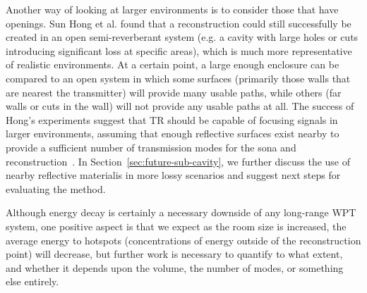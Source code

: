 Another way of looking at larger environments is to consider those that have openings. Sun Hong et al. found that a reconstruction could still successfully be created in an open semi-reverberant system (e.g. a cavity with large holes or cuts introducing significant loss at specific areas), which is much more representative of realistic environments. At a certain point, a large enough enclosure can be compared to an open system in which some surfaces (primarily those walls that are nearest the transmitter) will provide many usable paths, while others (far walls or cuts in the wall) will not provide any usable paths at all. The success of Hong's experiments suggest that TR should be capable of focusing signals in larger environments, assuming that enough reflective surfaces exist nearby to provide a sufficient number of transmission modes for the sona and reconstruction~\cite{hong_nonlinear_2014}. In Section~\ref{sec:future-sub-cavity}, we further discuss the use of nearby reflective materialis in more lossy scenarios and suggest next steps for evaluating the method.


Although energy decay is certainly a necessary downside of any long-range WPT system, one positive aspect is that we expect as the room size is increased, the average energy to hotspots (concentrations of energy outside of the reconstruction point) will decrease, but further work is necessary to quantify to what extent, and whether it depends upon the volume, the number of modes, or something else entirely.